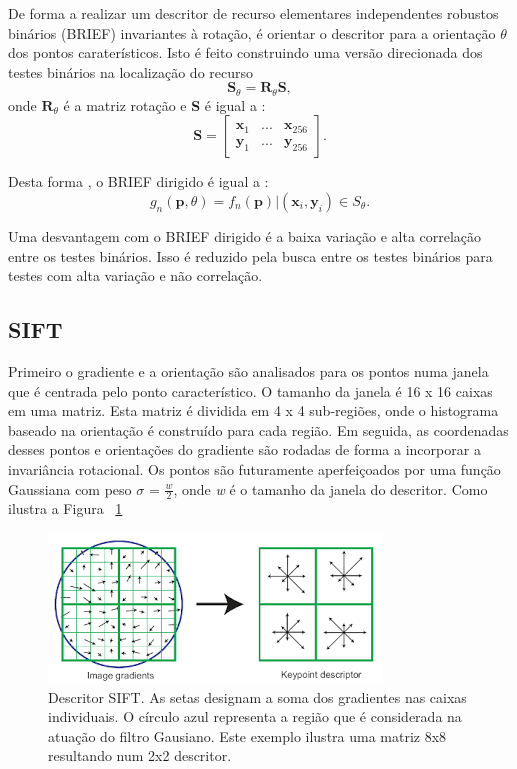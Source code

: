 De forma a realizar um descritor de recurso elementares independentes robustos binários (BRIEF) invariantes à rotação, é orientar o descritor para a orientação $\theta$ dos pontos caraterísticos. Isto é feito construindo uma versão direcionada dos testes binários na localização do recurso \[ \textbf{$\textbf{S}_{\theta} = \textbf{R}_{\theta}\textbf{S}$} ,\] onde \textbf{$\textbf{R}_{\theta}$} é a matriz rotação e \textbf{S} é igual a : \[ \textbf{S} = \left[ \begin{array}{ccc}
\textbf{x}_1 & ... & \textbf{x}_{256}\\
\textbf{y}_1 & ... & \textbf{y}_{256}
\end{array} \right] . \]

Desta forma , o BRIEF dirigido é igual a : \[ g_n(\textbf{p},\theta) = f_n(\textbf{p})|(\textbf{x}_i,\textbf{y}_i) \in S_{\theta} .\]


Uma desvantagem com o BRIEF dirigido é a baixa variação e alta correlação entre os testes binários. Isso é reduzido pela busca entre os testes binários para testes com alta variação e não correlação. 	

\subsection{SIFT}

Primeiro o gradiente e a orientação são analisados para os pontos numa janela que é centrada pelo ponto característico. O tamanho da janela é 16 x 16 caixas em uma matriz. Esta matriz é dividida em 4 x 4 sub-regiões, onde o histograma baseado na orientação é construído para cada região. Em seguida, as coordenadas desses pontos e orientações do gradiente são rodadas de forma a incorporar a invariância rotacional. Os pontos são futuramente aperfeiçoados por uma função Gaussiana com peso $\sigma$ = $\frac{w}{2}$, onde \textit{w} é o tamanho da janela do descritor. Como ilustra a Figura ~\ref{fig:siftdescriptor}

\begin{figure}[h!]
	\centering
	\includegraphics[width=0.7\linewidth]{figures/SIFTdescriptor}
	\caption{Descritor SIFT. As setas designam a soma dos gradientes nas caixas individuais. O círculo azul representa a região que é considerada na atuação do filtro Gausiano. Este exemplo ilustra uma matriz 8x8 resultando num 2x2 descritor. \cite{VisualOdometryRodasVehicles}}
	\label{fig:siftdescriptor}
\end{figure}

